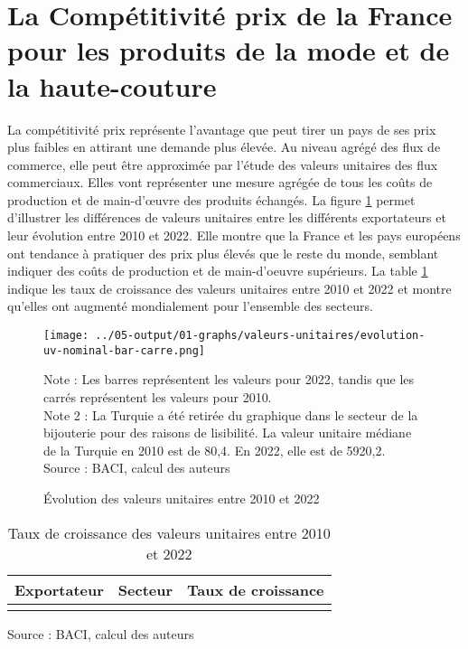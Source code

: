 \documentclass[french,10pt,a4paper]{article}
\begin{document}
\section{La Compétitivité prix de la France pour les produits de la mode et de la haute-couture}
La compétitivité prix représente l'avantage que peut tirer un pays de ses prix plus faibles en attirant une demande plus élevée. Au niveau agrégé des flux de commerce, elle peut être approximée par l'étude des valeurs unitaires des flux commerciaux. Elles vont représenter une mesure agrégée de tous les coûts de production et de main-d'œuvre des produits échangés. La figure \ref{fig:valeurs-unitaires} permet d'illustrer les différences de valeurs unitaires entre les différents exportateurs et leur évolution entre 2010 et 2022. Elle montre que la France et les pays européens ont tendance à pratiquer des prix plus élevés que le reste du monde, semblant indiquer des coûts de production et de main-d'oeuvre supérieurs. La table \ref{tab:taux-croissance-uv} indique les taux de croissance des valeurs unitaires entre 2010 et 2022 et montre qu'elles ont augmenté mondialement pour l'ensemble des secteurs.

\begin{figure}[!h]
  \centering
  \texttt{[image: ../05-output/01-graphs/valeurs-unitaires/evolution-uv-nominal-bar-carre.png]}
  \captionsetup{justification=justified, singlelinecheck=false, font=small}
  \caption*{Note : Les barres représentent les valeurs pour 2022, tandis que les carrés représentent les valeurs pour 2010. \\
  Note 2 : La Turquie a été retirée du graphique dans le secteur de la bijouterie pour des raisons de lisibilité. La valeur unitaire médiane de la Turquie en 2010 est de 80,4. En 2022, elle est de 5920,2. \\
  Source : BACI, calcul des auteurs}
  \captionsetup{justification=centering, singlelinecheck=true, font=normalsize}
  \caption{Évolution des valeurs unitaires entre 2010 et 2022}
  \label{fig:valeurs-unitaires}
\end{figure}

\begin{table}[ht]
  \centering
  \begin{tabular}{lrr}
    \hline
   Exportateur & Secteur & Taux de croissance \\
    \hline
    \\
    \hline
  \end{tabular}
  \captionsetup{justification=raggedright,singlelinecheck=false, font=small}
  \caption*{Source : BACI, calcul des auteurs}
  \captionsetup{justification=centering, singlelinecheck=true, font=normalsize}
  \caption{Taux de croissance des valeurs unitaires entre 2010 et 2022}
  \label{tab:taux-croissance-uv}
\end{table}
\end{document}
